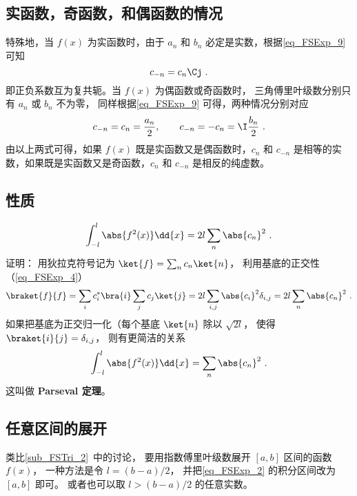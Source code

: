 \subsection{实函数，奇函数，和偶函数的情况}
特殊地，当 $f(x)$ 为实函数时，由于 $a_n$ 和 $b_n$ 必定是实数，根据\autoref{eq_FSExp_9} 可知
\begin{equation}
c_{-n} = c_{n}\Cj~.
\end{equation}
即正负系数互为复共轭。当 $f(x)$ 为偶函数或奇函数时， 三角傅里叶级数分别只有 $a_n$ 或 $b_n$ 不为零， 同样根据\autoref{eq_FSExp_9} 可得，两种情况分别对应
\begin{equation}
c_{-n} = c_n =\frac{a_n}{2}, \qquad
c_{-n} = -c_n = \I \frac{b_n}{2}~.
\end{equation}
由以上两式可得，如果 $f(x)$ 既是实函数又是偶函数时，$c_n$ 和 $c_{-n}$ 是相等的实数，如果既是实函数又是奇函数，$c_n$ 和 $c_{-n}$ 是相反的纯虚数。

\subsection{性质}
\begin{equation}
\int_{-l}^l \abs{f^2(x)} \dd{x} =  2l\sum_n \abs{c_n}^2~.
\end{equation}
证明： 用狄拉克符号记为 $\ket{f} = \sum_n c_n \ket{n}$， 利用基底的正交性（\autoref{eq_FSExp_4}）
\begin{equation}
\braket{f}{f} = \sum_i c_i^* \bra{i} \sum_j c_j \ket{j} = 2l \sum_{i,j} \abs{c_i}^2 \delta_{i,j} = 2l \sum_n \abs{c_n}^2~.
\end{equation}
如果把基底为正交归一化（每个基底 $\ket{n}$ 除以 $\sqrt{2l}$， 使得 $\braket{i}{j} = \delta_{i,j}$， 则有更简洁的关系
\begin{equation}\label{eq_FSExp_5}
\int_{-l}^l \abs{f^2(x)} \dd{x} =  \sum_n \abs{c_n}^2~.
\end{equation}
这叫做 \textbf{Parseval 定理}。

\subsection{任意区间的展开}
类比\autoref{sub_FSTri_2}~中的讨论， 要用指数傅里叶级数展开 $[a, b]$ 区间的函数 $f(x)$， 一种方法是令 $l = (b - a)/2$， 并把\autoref{eq_FSExp_2} 的积分区间改为 $[a, b]$ 即可。 或者也可以取 $l > (b - a)/2$ 的任意实数。
